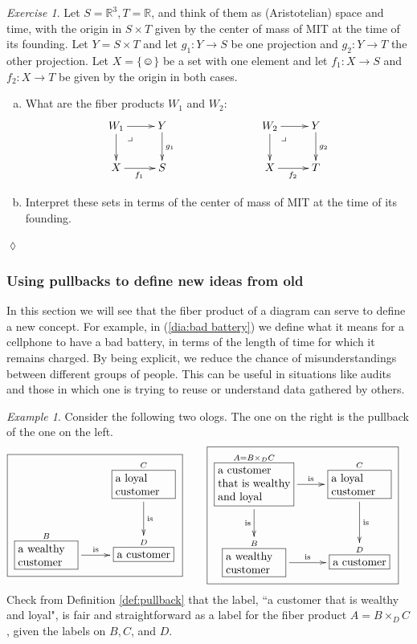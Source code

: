 \documentclass{book}
\makeatletter
\def\tn{\textnormal}
\def\RR{{\mathbb R}}
\def\hsp{\hspace{.3in}}
\def\singleton{\{\smiley\}}
\def\to{\rightarrow}
\def\taking{\colon}
\def\rr{\raggedright}
\newcommand{\LA}[2]{\ar[#1]^-{\tn {#2}}}
\newcommand{\LAL}[2]{\ar[#1]_-{\tn {#2}}}
\newcommand{\obox}[3]{\stackrel{#1}{\fbox{\parbox{#2}{#3}}}}
\newcommand{\smbox}[2]{\stackrel{#1}{\fbox{#2}}}
\def\ullimit{\ar@{}[rd]|(.3)*+{\lrcorner}}
\theoremstyle{remark}
\newtheorem{example}[subsubsection]{Example}
\newtheorem{exc}[subsubsection]{Exercise}
\newenvironment{exercise}{\begin{exc}}{\hspace*{\fill}$\lozenge$\end{exc}}
\theoremstyle{definition}
\def\sexc{\begin{enumerate}[a.)]\setlength{\itemsep}{.1cm}\setlength{\parskip}{.1cm}\item}
\def\next{\item}
\def\endsexc{\end{enumerate}}
\makeatother
\begin{document}
\begin{exercise}
Let $S=\RR^3, T=\RR$, and think of them as (Aristotelian) space and time, with the origin in $S\times T$ given by the center of mass of MIT at the time of its founding. Let $Y=S\times T$ and let $g_1\taking Y\to S$ be one projection and $g_2\taking Y\to T$ the other projection. Let $X=\singleton$ be a set with one element and let $f_1\taking X\to S$ and $f_2\taking X\to T$ be given by the origin in both cases. 
\sexc What are the fiber products $W_1$ and $W_2$:
$$
\xymatrix{W_1\ar[r]\ar[d]\ullimit&Y\ar[d]^{g_1}\\X\ar[r]_{f_1}&S}\hspace{1in}
\xymatrix{W_2\ar[r]\ar[d]\ullimit&Y\ar[d]^{g_2}\\X\ar[r]_{f_2}&T}
$$
\next Interpret these sets in terms of the center of mass of MIT at the time of its founding.
\endsexc
\end{exercise}


\subsubsection{Using pullbacks to define new ideas from old}

In this section we will see that the fiber product of a diagram can serve to define a new concept. For example, in (\ref{dia:bad battery}) we define what it means for a cellphone to have a bad battery, in terms of the length of time for which it remains charged. By being explicit, we reduce the chance of misunderstandings between different groups of people. This can be useful in situations like audits and those in which one is trying to reuse or understand data gathered by others.

\begin{example}

Consider the following two ologs. The one on the right is the pullback of the one on the left. 
\begin{align}\label{dia:wealthy and loyal}
\fbox{\xymatrixnocompile{&\obox{C}{.7in}{\rr a loyal customer}\LA{d}{is}\\\obox{B}{.7in}{\rr a wealthy customer}\LA{r}{is}&\smbox{D}{a customer}}}\hsp&\fbox{\xymatrix{\obox{A=B\times_DC}{.9in}{\rr a customer that is wealthy and loyal}\LAL{d}{is}\LA{r}{is}&\obox{C}{.7in}{\rr a loyal customer}\LA{d}{is}\\\obox{B}{.7in}{\rr a wealthy customer}\LA{r}{is}&\smbox{D}{a customer}}}
\end{align}
Check from Definition \ref{def:pullback} that the label, ``a customer that is wealthy and loyal", is fair and straightforward as a label for the fiber product $A=B\times_DC$, given the labels on $B,C$, and $D$.

\end{example}
\end{document}

